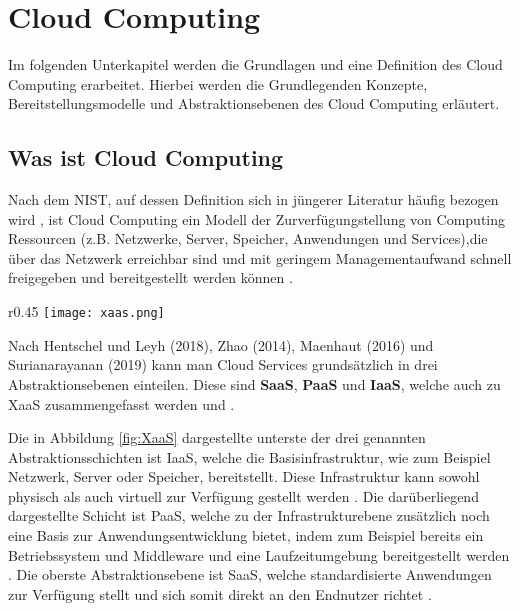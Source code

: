 \section{Cloud Computing}

Im folgenden Unterkapitel werden die Grundlagen und eine Definition des Cloud Computing erarbeitet. Hierbei werden die Grundlegenden Konzepte,
Bereitstellungsmodelle und Abstraktionsebenen des Cloud Computing erläutert.

\subsection{Was ist Cloud Computing}

Nach dem \ac{NIST}, auf dessen Definition sich in jüngerer Literatur häufig bezogen wird \cite[Vgl.][S. 4f]{Reinheimer2018}, ist Cloud Computing ein Modell der Zurverfügungstellung von Computing Ressourcen
(z.B. Netzwerke, Server, Speicher, Anwendungen und Services),die über das Netzwerk erreichbar sind und mit geringem Managementaufwand
schnell freigegeben und bereitgestellt werden können \cite[Vgl.][S. 2]{Mell2011}\cite[Vgl.][S. 5]{Reinheimer2018}.

\begin{wrapfigure}{r}{0.45\textwidth}
\centering
\texttt{[image: xaas.png]}
\caption{Eine Übersicht der Cloud Service Modelle \cite[Eigene Darstellung nach][S. 33]{Maenhaut2016}\cite[Ergänzt durch][]{Toroman2018}}
\label{fig:XaaS}
\end{wrapfigure}

Nach Hentschel und Leyh (2018), Zhao (2014), Maenhaut (2016) und Surianarayanan (2019) kann man Cloud Services grundsätzlich in drei Abstraktionsebenen einteilen. Diese sind \textbf{\ac{SaaS}},
\textbf{\ac{PaaS}} und \textbf{\ac{IaaS}}, welche auch zu \ac{XaaS} zusammengefasst werden
\cite[Vgl.][S. 9]{Reinheimer2018}\cite[Vgl.][S. 143f]{Zhao2014}\cite[Vgl.][S. 32ff]{Maenhaut2016} und \cite[Vgl.][S. 226ff]{Surianarayanan2019}.

Die in Abbildung \ref{fig:XaaS} dargestellte unterste der drei genannten Abstraktionsschichten ist \ac{IaaS},
welche die Basisinfrastruktur, wie zum Beispiel Netzwerk, Server oder Speicher, bereitstellt.
Diese Infrastruktur kann sowohl physisch als auch virtuell zur Verfügung gestellt werden \cite[Vgl.][S. 9f]{Reinheimer2018}.
Die darüberliegend dargestellte Schicht ist \ac{PaaS}, welche zu der Infrastrukturebene zusätzlich noch eine Basis zur Anwendungsentwicklung bietet, indem zum Beispiel
bereits ein Betriebssystem und Middleware und eine Laufzeitumgebung bereitgestellt werden \cite[Vgl.][S. 10]{Reinheimer2018}.
Die oberste Abstraktionsebene ist \ac{SaaS}, welche standardisierte Anwendungen zur Verfügung stellt und sich somit direkt an den Endnutzer richtet
\cite[Vgl.][S. 11]{Reinheimer2018}.

